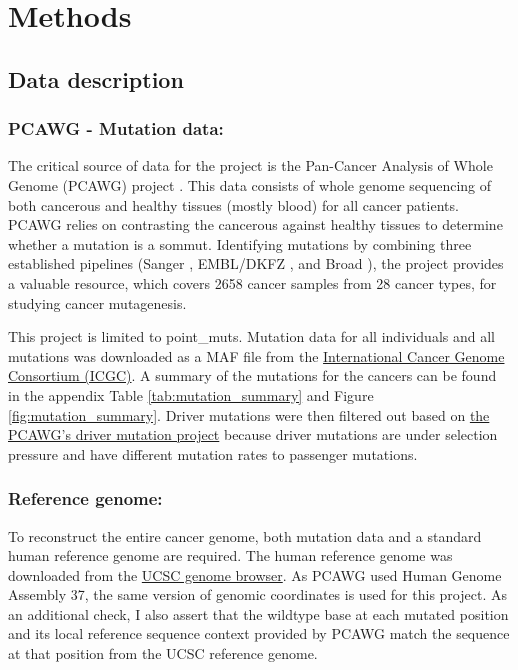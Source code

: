 \chapter{Methods}

\section{Data description}
\subsection{PCAWG - Mutation data:} 
The critical source of data for the project is the Pan-Cancer Analysis of Whole Genome (PCAWG) project \citep{Campbell2020}. This data consists of whole genome sequencing of both cancerous and healthy tissues (mostly blood) for all cancer patients. PCAWG relies on contrasting the cancerous against healthy tissues to determine whether a mutation is a \gls{sommut}. Identifying mutations by combining three established pipelines (Sanger \citep{Jones2016CgpCaVEManWrapper:Data}, EMBL/DKFZ \citep{Rimmer2014IntegratingApplications}, and Broad \citep{K2013SensitiveSamples}), the project provides a valuable resource, which covers 2658 cancer samples from 28 cancer types, for studying cancer mutagenesis.

This project is limited to \glspl{point_mut}. Mutation data for all individuals and all mutations was downloaded as a MAF file from the \href{https://dcc.icgc.org/releases/PCAWG/consensus_snv_indel}{International Cancer Genome Consortium (ICGC)}. A summary of the mutations for the cancers can be found in the appendix Table \ref{tab:mutation_summary} and Figure \ref{fig:mutation_summary}. Driver mutations were then filtered out based on \href{https://dcc.icgc.org/releases/PCAWG/driver_mutations}{the PCAWG's driver mutation project} because driver mutations are under selection pressure and have different mutation rates to passenger mutations. 

\subsection{Reference genome:} 
To reconstruct the entire cancer genome, both mutation data and a standard human reference genome are required. The human reference genome was downloaded from the \href{http://hgdownload.soe.ucsc.edu/goldenPath/hg19/chromosomes}{UCSC genome browser}. As PCAWG used Human Genome Assembly 37, the same version of genomic coordinates is used for this project. As an additional check, I also assert that the wildtype base at each mutated position and its local reference sequence context provided by PCAWG match the sequence at that position from the UCSC reference genome. 

